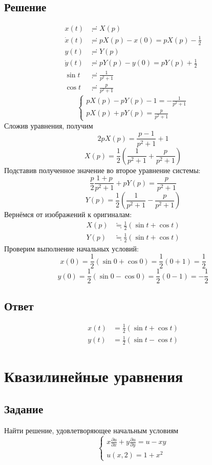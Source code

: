 \documentclass[a4paper,10pt,notitlepage,pdftex,headsepline]{scrartcl}
\begin{document}
\subsection*{Решение}
\[
\begin{aligned}
x(t) & \risingdotseq X(p)\\
\dot{x}(t) &\risingdotseq p X(p) - x(0) = p X(p) - \frac{1}{2}\\
y(t) &\risingdotseq Y(p)\\
\dot{y}(t) &\risingdotseq p Y(p) - y(0) = p Y(p) + \frac{1}{2}\\
\sin{t} &\risingdotseq \frac{1}{p^2 + 1}\\
\cos{t} &\risingdotseq \frac{p}{p^2 + 1}
\end{aligned}
\]
\[
\begin{cases}
p X(p) - p Y(p) - 1 = -\frac{1}{p^2 + 1}\\
p X(p) + p Y(p) = \frac{p}{p^2 + 1}
\end{cases}
\]
Сложив уравнения, получим
\[2 p X(p) = \frac{p - 1}{p^2 + 1} + 1\]
\[X(p) = \frac{1}{2}\left(\frac{1}{p^2 + 1} + \frac{p}{p^2 + 1}\right)\]
Подставив полученное значение во второе уравнение системы:
\[\frac{p}{2}\frac{1 + p}{p^2 + 1} + p Y(p) = \frac{p}{p^2 + 1}\]
\[Y(p) = \frac{1}{2}\left(\frac{1}{p^2 + 1} - \frac{p}{p^2 + 1}\right)\]
Вернёмся от изображений к оригиналам:
\[\begin{aligned}
X(p) &\fallingdotseq \frac{1}{2}\left(\sin{t} + \cos{t}\right)\\
Y(p) &\fallingdotseq \frac{1}{2}\left(\sin{t} + \cos{t}\right)
\end{aligned}\]
Проверим выполнение начальных условий:
\[ x(0) = \frac{1}{2}\left(\sin{0} + \cos{0}\right) = \frac{1}{2}\left(0 + 1\right) = \frac{1}{2}\]
\[ y(0) = \frac{1}{2}\left(\sin{0} - \cos{0}\right) = \frac{1}{2}\left(0 - 1\right) = -\frac{1}{2}\]
\subsection*{Ответ}
\[\begin{aligned}
x(t) &= \frac{1}{2}\left(\sin{t} + \cos{t}\right)\\
y(t) &= \frac{1}{2}\left(\sin{t} - \cos{t}\right)
\end{aligned}\]
\newpage
\section{Квазилинейные уравнения}
\subsection*{Задание}
Найти решение, удовлетворяющее начальным условиям
\[\begin{cases}
x\frac{\partial u}{\partial x} + y\frac{\partial u}{\partial y} = u - x y\\
u(x, 2) = 1 + x^2
\end{cases}\]
\end{document}

